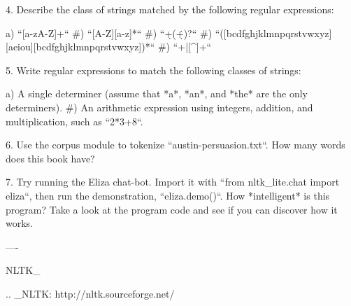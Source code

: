\documentclass[presentation]{beamer}
\begin{document}
4. Describe the class of strings matched by the following regular
   expressions:

   a) ``[a-zA-Z]+``
   #) ``[A-Z][a-z]*``
   #) ``\d+(\.\d+)?``
   #) ``([bcdfghjklmnpqrstvwxyz][aeiou][bcdfghjklmnpqrstvwxyz])*``
   #) ``\w+|[^\w\s]+``

5. Write regular expressions to match the following classes of strings:

  a) A single determiner (assume that *a*, *an*, and *the*
     are the only determiners).
  #) An arithmetic expression using integers, addition, and
     multiplication, such as ``2*3+8``.

6. Use the corpus module to tokenize ``austin-persuasion.txt``.
   How many words does this book have?

7. Try running the Eliza chat-bot.  Import it with
   ``from nltk_lite.chat import eliza``, then run the demonstration,
   ``eliza.demo()``.  How *intelligent* is this program?
   Take a look at the program code and see if you can
   discover how it works.

----

NLTK_

.. _NLTK: http://nltk.sourceforge.net/
\end{document}
